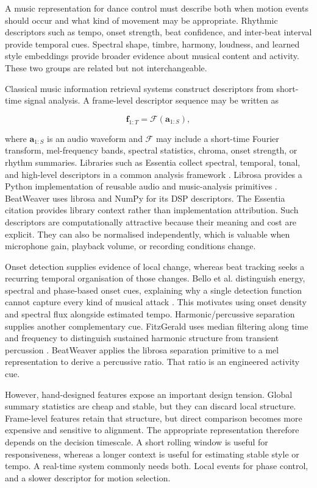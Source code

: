 A music representation for dance control must describe both when motion
events should occur and what kind of movement may be appropriate.
Rhythmic descriptors such as tempo, onset strength, beat confidence, and
inter-beat interval provide temporal cues. Spectral shape, timbre, harmony,
loudness, and learned style embeddings provide broader evidence about musical
content and activity. These two groups are related but not interchangeable.

Classical music information retrieval systems construct descriptors from
short-time signal analysis. A frame-level descriptor sequence may be written as

\begin{equation}
    \mathbf{f}_{1:T}
    = \mathcal{F}\!\left(\mathbf{a}_{1:S}\right),
\end{equation}

where $\mathbf{a}_{1:S}$ is an audio waveform and $\mathcal{F}$ may include a
short-time Fourier transform, mel-frequency bands, spectral statistics,
chroma, onset strength, or rhythm summaries. Libraries such as Essentia collect
spectral, temporal, tonal, and high-level descriptors in a common analysis
framework \cite{bogdanov2013essentia}. Librosa provides a Python implementation
of reusable audio and music-analysis primitives \cite{mcfee2015librosa}.
BeatWeaver uses librosa and NumPy for its DSP descriptors. The Essentia citation
provides library context rather than implementation attribution. Such descriptors are computationally
attractive because their meaning and cost are explicit. They can also be
normalised independently, which is valuable when microphone gain, playback
volume, or recording conditions change.

Onset detection supplies evidence of local change, whereas beat tracking seeks
a recurring temporal organisation of those changes. Bello et al. distinguish
energy, spectral and phase-based onset cues, explaining why a single detection
function cannot capture every kind of musical attack \cite{bello2005tutorial}.
This motivates using onset density and spectral flux alongside estimated
tempo. Harmonic/percussive separation supplies another complementary cue.
FitzGerald uses median filtering along time and frequency to distinguish
sustained harmonic structure from transient percussion \cite{fitzgerald2010harmonic}.
BeatWeaver applies the librosa separation primitive to a mel representation
to derive a percussive ratio. That ratio is an engineered activity cue.

However, hand-designed features expose an important design tension. Global
summary statistics are cheap and stable, but they can discard local structure.
Frame-level features retain that structure, but direct comparison becomes more
expensive and sensitive to alignment. The appropriate representation therefore
depends on the decision timescale. A short rolling window is useful for
responsiveness, whereas a longer context is useful for estimating stable style
or tempo. A real-time system commonly needs both. Local events for phase
control, and a slower descriptor for motion selection.


